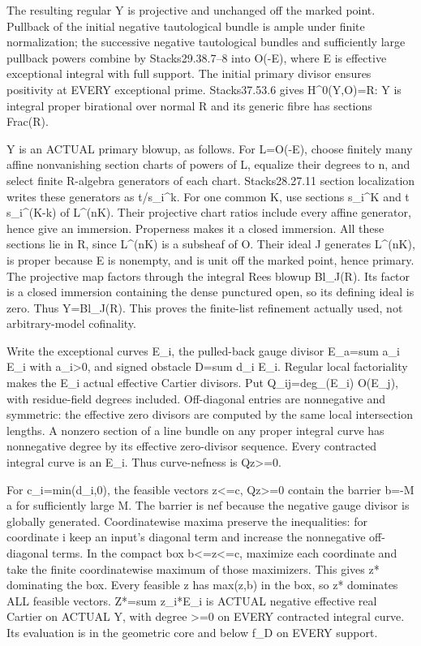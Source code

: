 The resulting regular Y is projective and unchanged off the marked point. Pullback of the initial negative tautological bundle is ample under finite normalization; the successive negative tautological bundles and sufficiently large pullback powers combine by Stacks29.38.7--8 into O(-E), where E is effective exceptional integral with full support. The initial primary divisor ensures positivity at EVERY exceptional prime. Stacks37.53.6 gives H\textasciicircum{}0(Y,O)=R: Y is integral proper birational over normal R and its generic fibre has sections Frac(R).

Y is an ACTUAL primary blowup, as follows. For L=O(-E), choose finitely many affine nonvanishing section charts of powers of L, equalize their degrees to n, and select finite R-algebra generators of each chart. Stacks28.27.11 section localization writes these generators as t/s\_i\textasciicircum{}k. For one common K, use sections s\_i\textasciicircum{}K and t s\_i\textasciicircum{}(K-k) of L\textasciicircum{}(nK). Their projective chart ratios include every affine generator, hence give an immersion. Properness makes it a closed immersion. All these sections lie in R, since L\textasciicircum{}(nK) is a subsheaf of O. Their ideal J generates L\textasciicircum{}(nK), is proper because E is nonempty, and is unit off the marked point, hence primary. The projective map factors through the integral Rees blowup Bl\_J(R). Its factor is a closed immersion containing the dense punctured open, so its defining ideal is zero. Thus Y=Bl\_J(R). This proves the finite-list refinement actually used, not arbitrary-model cofinality.

Write the exceptional curves E\_i, the pulled-back gauge divisor E\_a=sum a\_i E\_i with a\_i\textgreater{}0, and signed obstacle D=sum d\_i E\_i. Regular local factoriality makes the E\_i actual effective Cartier divisors. Put Q\_ij=deg\_(E\_i) O(E\_j), with residue-field degrees included. Off-diagonal entries are nonnegative and symmetric: the effective zero divisors are computed by the same local intersection lengths. A nonzero section of a line bundle on any proper integral curve has nonnegative degree by its effective zero-divisor sequence. Every contracted integral curve is an E\_i. Thus curve-nefness is Qz\textgreater{}=0.

For c\_i=min(d\_i,0), the feasible vectors z\textless{}=c, Qz\textgreater{}=0 contain the barrier b=-M a for sufficiently large M. The barrier is nef because the negative gauge divisor is globally generated. Coordinatewise maxima preserve the inequalities: for coordinate i keep an input's diagonal term and increase the nonnegative off-diagonal terms. In the compact box b\textless{}=z\textless{}=c, maximize each coordinate and take the finite coordinatewise maximum of those maximizers. This gives z* dominating the box. Every feasible z has max(z,b) in the box, so z* dominates ALL feasible vectors. Z*=sum z\_i*E\_i is ACTUAL negative effective real Cartier on ACTUAL Y, with degree \textgreater{}=0 on EVERY contracted integral curve. Its evaluation is in the geometric core and below f\_D on EVERY support.

